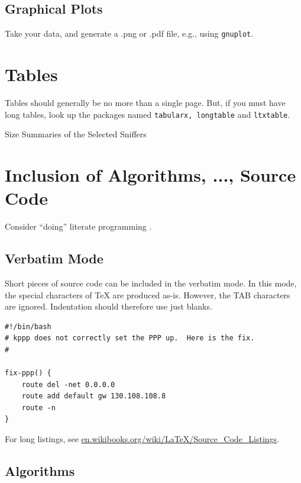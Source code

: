 \subsection{Graphical Plots}

Take your  data, and generate a .png or .pdf file, e.g., using
{\tt gnuplot}.


\section{Tables}

Tables should generally be no more than a single page.  But, if you
must have long tables, look up the packages named {\tt tabularx,
  longtable} and {\tt ltxtable}.

\begin{table}[htb]
\centering

\caption{Size Summaries of the Selected Sniffers}\label{metric}
\end{table}

\section{Inclusion of Algorithms, ..., Source Code}

Consider ``doing'' literate programming \cite{LP-KNUTH}.

\subsection{Verbatim Mode}

Short pieces of source code can be included in the verbatim mode.  In
this mode, the special characters of \TeX{} are produced as-is.
However, the TAB characters are ignored.  Indentation should therefore
use just blanks.

\begin{verbatim}
#!/bin/bash
# kppp does not correctly set the PPP up.  Here is the fix.
#

fix-ppp() {
    route del -net 0.0.0.0
    route add default gw 130.108.108.8
    route -n
}
\end{verbatim}

For long listings, see \url{en.wikibooks.org/wiki/LaTeX/Source_Code_Listings}.

\subsection{Algorithms}

\newcommand\cupEq{\protect{~\cup{\kern -0.5em}=~}}
\newcommand\plusEq{\protect{~+{\kern -0.5em}=~}}
\newcommand{\OMath}{\ensuremath{\mathcal{O}}}
\renewcommand{\emptyset}{\{\}}
\newcommand\on[2]{{\bf on}{~}{#1}{~\bf do~}{#2}}
\newcommand\bang{{\bf !}~}
\newcommand\query{{\bf ?}~}


